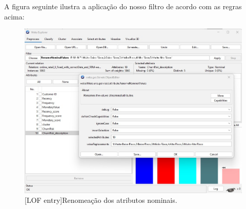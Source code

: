 \documentclass{easychair}
\begin{document}
\newpage
A figura seguinte ilustra a aplicação do nosso filtro de acordo com as regras acima:

\begin{figure}[H]
    \begin{centering}
    \includegraphics[width=1\linewidth]{imagens/figure23.jpg}\label{cap-3-fig23}
    [LOF entry]{Renomeação dos atributos nominais.}
    \label{fig23}
    \end{centering}
\end{figure}

\section{}




\end{document}
